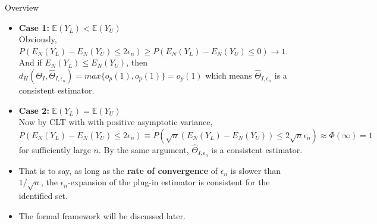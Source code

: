 \documentclass[aspectratio=169]{beamer}  %
\begin{document}
\begin{frame}{Overview}
    \begin{itemize}
        \item \textbf{Case 1:} $\mathbb{E}(Y_L) < \mathbb{E}(Y_U)$ \\
        Obviously, $P(E_N(Y_L)-E_N(Y_U)\le2\epsilon_n)\geq P(E_N(Y_L)-E_N(Y_U)\le0)\to 1$. And if $E_N(Y_L) \le E_N(Y_U)$, then $d_H(\Theta_I,\hat{\Theta}_{I,\epsilon_n})=max\{o_p(1),o_p(1)\}=o_p(1)$ which means $\hat{\Theta}_{I,\epsilon_n}$ is a consistent estimator.
        \item \textbf{Case 2:} $\mathbb{E}(Y_L) = \mathbb{E}(Y_U)$ \\
        Now by CLT with with positive asymptotic variance, $P(E_N(Y_L) - E_N(Y_U) \leq 2\epsilon_n)\equiv P(\sqrt{n}(E_N(Y_L)-E_N(Y_U))\leq 2\sqrt{n}\epsilon_n)\approx\Phi(\infty)=1$ for sufficiently large $n$. By the same argument, $\hat{\Theta}_{I,\epsilon_n}$ is a consistent estimator.
        \item That is to say, as long as the \textbf{rate of convergence} of $\epsilon_n$ is slower than $1/\sqrt{n}$, the $\epsilon_n$-expansion of the plug-in estimator is consistent for the identified set.
        \item The formal framework will be discussed later.
    \end{itemize}
\end{frame}
\end{document}
